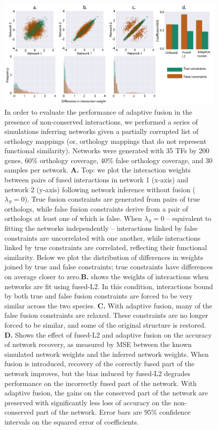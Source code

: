 \documentclass[11pt]{article}
\begin{document}
\begin{figure}
\begin{center}
  \includegraphics[scale=0.30]{figure_4_rev1.pdf}
  \caption{\label{adaptivefusion} In order to evaluate the performance of adaptive fusion in the presence of non-conserved interactions, we performed a series of simulations inferring networks given a partially corrupted list of orthology mappings (or, orthology mappings that do not represent functional similarity).
    Networks were generated with 35 TFs by 200 genes, 60\% orthology coverage, 40\% false orthology coverage, and 30 samples per network. \textbf{A.} Top: we plot the interaction weights between pairs of fused interactions in network 1 (x-axis) and network 2 (y-axis) following network inference without fusion ($\lambda_S=0$). True fusion constraints are generated from pairs of true orthologs, while false fusion constraints derive from a pair of orthologs at least one of which is false. When $\lambda_S=0$ -- equivalent to fitting the networks independently -- interactions linked by false constraints are uncorrelated with one another, while interactions linked by true constraints are correlated, reflecting their functional similarity. Below we plot the distribution of differences in weights joined by true and false constraints; true constraints have differences on average closer to zero.\textbf{B.} shows the weights of interactions when networks are fit using fused-L2. In this condition, interactions bound by both true and false fusion constraints are forced to be very similar across the two species. \textbf{C.} With adaptive fusion, many of the false fusion constraints are relaxed. These constraints are no longer forced to be similar, and some of the original structure is restored. \textbf{D.} Shows the effect of fused-L2 and adaptive fusion on the accuracy of network recovery, as measured by MSE between the known simulated network weights and the inferred network weights. When fusion is introduced, recovery of the correctly fused part of the network improves, but the bias induced by fused-L2 degrades performance on the incorrectly fused part of the network. With adaptive fusion, the gains on the conserved part of the network are preserved with significantly less loss of accuracy on the non-conserved part of the network. Error bars are $95\%$ confidence intervals on the squared error of coefficients.}
\end{center}
\end{figure}
\end{document}
